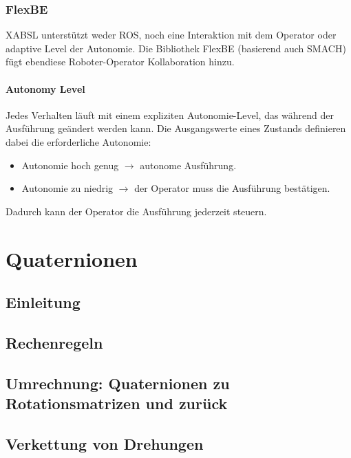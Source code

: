 		\subsection{FlexBE}
			XABSL unterstützt weder ROS, noch eine Interaktion mit dem Operator oder adaptive Level der Autonomie. Die Bibliothek FlexBE (basierend auch SMACH) fügt ebendiese Roboter-Operator Kollaboration hinzu.

			\subsubsection{Autonomy Level}
				Jedes Verhalten läuft mit einem expliziten Autonomie-Level, das während der Ausführung geändert werden kann. Die Ausgangswerte eines Zustands definieren dabei die erforderliche Autonomie:
				\begin{itemize}
					\item Autonomie hoch genug \(\to\) autonome Ausführung.
					\item Autonomie zu niedrig \(\to\) der Operator muss die Ausführung bestätigen.
				\end{itemize}
				Dadurch kann der Operator die Ausführung jederzeit steuern.





\appendix

\chapter{Quaternionen} %

	\section{Einleitung} %

	\section{Rechenregeln} %

	\section{Umrechnung: Quaternionen zu Rotationsmatrizen und zurück} %

	\section{Verkettung von Drehungen} %

